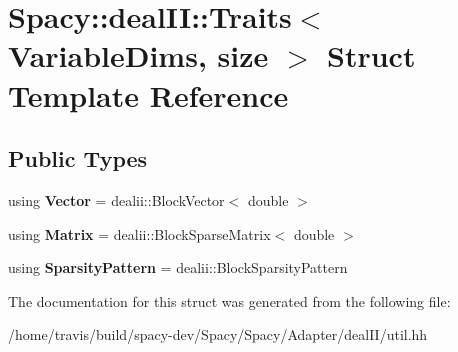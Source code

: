 \hypertarget{structSpacy_1_1dealII_1_1Traits}{\section{Spacy\-:\-:deal\-I\-I\-:\-:Traits$<$ Variable\-Dims, size $>$ Struct Template Reference}
\label{structSpacy_1_1dealII_1_1Traits}
}
\subsection*{Public Types}
\begin{DoxyCompactItemize}
\item 
\hypertarget{structSpacy_1_1dealII_1_1Traits_a25092922cd45dd1c366a5471aff7885e}{using {\bfseries Vector} = dealii\-::\-Block\-Vector$<$ double $>$}\label{structSpacy_1_1dealII_1_1Traits_a25092922cd45dd1c366a5471aff7885e}

\item 
\hypertarget{structSpacy_1_1dealII_1_1Traits_a39cb231dbc486306592d4639668677e1}{using {\bfseries Matrix} = dealii\-::\-Block\-Sparse\-Matrix$<$ double $>$}\label{structSpacy_1_1dealII_1_1Traits_a39cb231dbc486306592d4639668677e1}

\item 
\hypertarget{structSpacy_1_1dealII_1_1Traits_a19f03315284e5ed2b2443789cec8ab67}{using {\bfseries Sparsity\-Pattern} = dealii\-::\-Block\-Sparsity\-Pattern}\label{structSpacy_1_1dealII_1_1Traits_a19f03315284e5ed2b2443789cec8ab67}

\end{DoxyCompactItemize}


The documentation for this struct was generated from the following file\-:\begin{DoxyCompactItemize}
\item 
/home/travis/build/spacy-\/dev/\-Spacy/\-Spacy/\-Adapter/deal\-I\-I/util.\-hh\end{DoxyCompactItemize}
